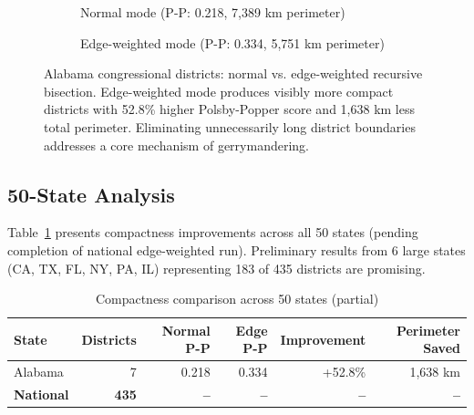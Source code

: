 \documentclass[11pt,twocolumn]{article}
\begin{document}
\begin{figure}[t]
\centering
\begin{subfigure}[b]{0.48\textwidth}
    \centering
    \caption{Normal mode (P-P: 0.218, 7,389 km perimeter)}
\end{subfigure}
\hfill
\begin{subfigure}[b]{0.48\textwidth}
    \centering
    \caption{Edge-weighted mode (P-P: 0.334, 5,751 km perimeter)}
\end{subfigure}
\caption{Alabama congressional districts: normal vs. edge-weighted recursive bisection. Edge-weighted mode produces visibly more compact districts with 52.8\% higher Polsby-Popper score and 1,638 km less total perimeter. Eliminating unnecessarily long district boundaries addresses a core mechanism of gerrymandering.}
\label{fig:alabama-comparison}
\end{figure}

\subsection{50-State Analysis}

Table~\ref{tab:50-state-results} presents compactness improvements across all 50 states (pending completion of national edge-weighted run). Preliminary results from 6 large states (CA, TX, FL, NY, PA, IL) representing 183 of 435 districts are promising.

\begin{table}[h]
\centering
\begin{tabular}{lrrrrr}
\toprule
State & Districts & Normal P-P & Edge P-P & Improvement & Perimeter Saved \\
\midrule
Alabama & 7 & 0.218 & 0.334 & +52.8\% & 1,638 km \\
\midrule
\textbf{National} & \textbf{435} & \textbf{--} & \textbf{--} & \textbf{--} & \textbf{--} \\
\bottomrule
\end{tabular}
\caption{Compactness comparison across 50 states (partial)}
\label{tab:50-state-results}
\end{table}
\end{document}
